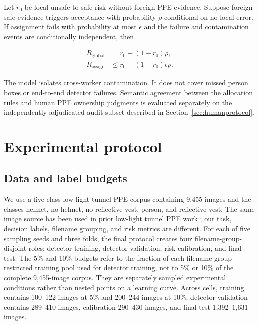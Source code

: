 \documentclass[iicol,pdflatex,sn-mathphys-num]{sn-jnl}
\begin{document}
Let $r_0$ be local unsafe-to-safe risk without foreign PPE evidence. Suppose foreign safe evidence triggers acceptance with probability $\rho$ conditional on no local error. If assignment fails with probability at most $\epsilon$ and the failure and contamination events are conditionally independent, then

\begin{equation}
\begin{aligned}
R_{\mathrm{global}}&=r_0+(1-r_0)\rho,\\
R_{\mathrm{assign}}&\leq r_0+(1-r_0)\epsilon\rho.
\end{aligned}
\label{eq:contamination}
\end{equation}

The model isolates cross-worker contamination. It does not cover missed person boxes or end-to-end detector failures. Semantic agreement between the allocation rules and human PPE ownership judgments is evaluated separately on the independently adjudicated audit subset described in Section~\ref{sec:humanprotocol}.

\section{Experimental protocol}\label{sec:experiments}

\subsection{Data and label budgets}

We use a five-class low-light tunnel PPE corpus containing 9,455 images and the classes helmet, no helmet, no reflective vest, person, and reflective vest. The same image source has been used in prior low-light tunnel PPE work \cite{wang2023lowlight}; our task, decision labels, filename grouping, and risk metrics are different. For each of five sampling seeds and three folds, the final protocol creates four filename-group-disjoint roles: detector training, detector validation, risk calibration, and final test. The 5\% and 10\% budgets refer to the fraction of each filename-group-restricted training pool used for detector training, not to 5\% or 10\% of the complete 9,455-image corpus. They are separately sampled experimental conditions rather than nested points on a learning curve. Across cells, training contains 100--122 images at 5\% and 200--244 images at 10\%; detector validation contains 289--410 images, calibration 290--430 images, and final test 1,392--1,631 images.
\end{document}
